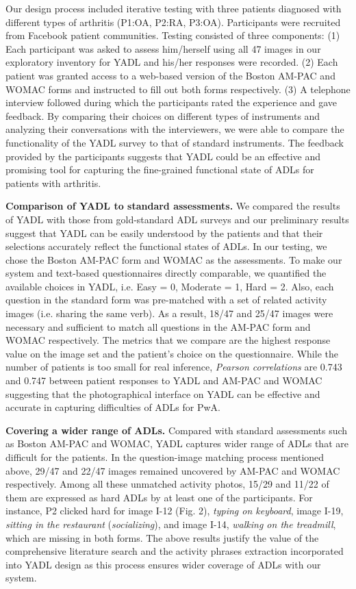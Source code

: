 \documentclass{sig-alternate-05-2015}
\begin{document}
Our design process included iterative testing with three patients diagnosed with different types of arthritis (P1:OA, P2:RA, P3:OA). Participants were recruited from Facebook patient communities. Testing consisted of three components: (1) Each participant was asked to assess him/herself using all 47 images in our exploratory inventory for YADL and his/her responses were recorded. (2) Each patient was granted access to a web-based version of the Boston AM-PAC and WOMAC forms and instructed to fill out both forms respectively. (3) A telephone interview followed during which the participants rated the experience and gave feedback. By comparing their choices on different types of instruments and analyzing their conversations with the interviewers, we were able to compare the functionality of the YADL survey to that of standard instruments. The feedback provided by the participants suggests that YADL could be an effective and promising tool for capturing the fine-grained functional state of ADLs for patients with arthritis.

\textbf{Comparison of YADL to standard assessments.} We compared the results of YADL with those from gold-standard ADL surveys and our preliminary results suggest that YADL can be easily understood by the patients and that their selections accurately reflect the functional states of ADLs. In our testing, we chose the Boston AM-PAC form and WOMAC as the assessments. To make our system and text-based questionnaires directly comparable, we quantified the available choices in YADL, i.e. Easy = 0, Moderate = 1, Hard = 2. Also, each question in the standard form was pre-matched with a set of related activity images (i.e. sharing the same verb). As a result, 18/47 and 25/47 images were necessary and sufficient to match all questions in the AM-PAC form and WOMAC respectively. The metrics that we compare are the highest response value on the image set and the patient's choice on the questionnaire. While the number of patients is too small for real inference, \textit{Pearson correlations} are 0.743 and 0.747 between patient responses to YADL and AM-PAC and WOMAC suggesting that the photographical interface on YADL can be effective and accurate in capturing difficulties of ADLs for PwA.

\textbf{Covering a wider range of ADLs.} Compared with standard assessments such as Boston AM-PAC and WOMAC, YADL captures wider range of ADLs that are difficult for the patients. In the question-image matching process mentioned above, 29/47 and 22/47 images remained uncovered by AM-PAC and WOMAC respectively. Among all these unmatched activity photos, 15/29 and 11/22 of them are expressed as hard ADLs by at least one of the participants. For instance, P2 clicked hard for image I-12 (Fig. 2), \textit{typing on keyboard}, image I-19, \textit{sitting in the restaurant} (\textit{socializing}), and image I-14, \textit{walking on the treadmill}, which are missing in both forms. The above results justify the value of the comprehensive literature search and the activity phrases extraction incorporated into YADL design as this process ensures wider coverage of ADLs with our system.
\end{document}
